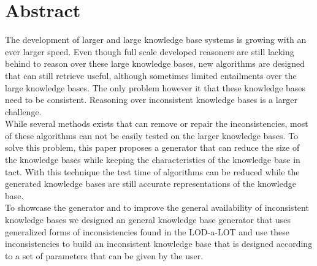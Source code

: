 \documentclass{article}
\begin{document}
\section*{Abstract}
The development of larger and large knowledge base systems is growing with an ever larger speed. Even though full scale developed reasoners are still lacking behind to reason over these large knowledge bases, new algorithms are designed that can still retrieve useful, although sometimes limited entailments over the large knowledge bases. The only problem however it that these knowledge bases need to be consistent. Reasoning over inconsistent knowledge bases is a larger challenge. \\
While several methods exists that can remove or repair the inconsistencies, most of these algorithms can not be easily tested on the larger knowledge bases. To solve this problem, this paper proposes a generator that can reduce the size of the knowledge bases while keeping the characteristics of the knowledge base in tact. With this technique the test time of algorithms can be reduced while the generated knowledge bases are still accurate representations of the knowledge base.\\
To showcase the generator and to improve the general availability of inconsistent knowledge bases we designed an general knowledge base generator that uses generalized forms of inconsistencies found in the LOD-a-LOT \cite{JavierD:2017} and use these inconsistencies to build an inconsistent knowledge base that is designed according to a set of parameters that can be given by the user.\\

\newpage
\tableofcontents
\newpage
{}
\end{document}
